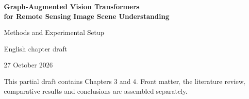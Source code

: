 \documentclass[12pt,a4paper]{report}
\numberwithin{equation}{chapter}                          %
\renewcommand{\contentsname}{}
\renewcommand{\cftsecpagefont}{\color{white}}        %
\begin{document}
\onehalfspacing
\setlength{\parindent}{0pt}
\setlength{\parskip}{0.3em}
\setlength{\emergencystretch}{2em}
\renewcommand{\cftsecpagefont}{\normalfont}
\renewcommand{\contentsname}{Contents}
\begin{titlepage}
\centering
\vspace*{2cm}
{\Large\bfseries Graph-Augmented Vision Transformers\\[0.4em]
for Remote Sensing Image Scene Understanding\par}
\vspace{2cm}
{\large Methods and Experimental Setup\par}
\vspace{0.5cm}
{\large English chapter draft\par}
\vfill
27 October 2026\par
\vspace{0.7cm}
{\small This partial draft contains Chapters 3 and 4. Front matter, the
literature review, comparative results and conclusions are assembled separately.}
\end{titlepage}
\tableofcontents
\clearpage
{}
\setcounter{chapter}{2}


\clearpage
\renewcommand{\bibname}{References}


\end{document}

